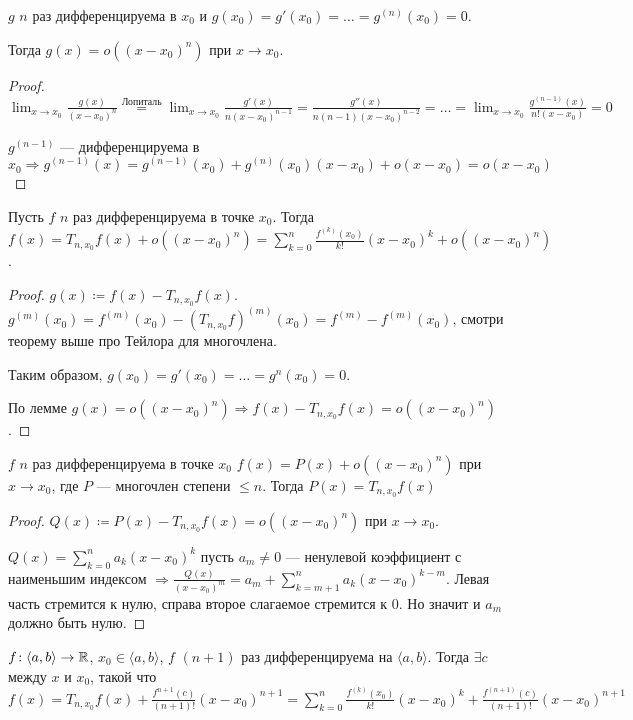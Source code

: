 \begin{lemma}
    $g$  $n$ раз дифференцируема в  $x_0$ и  $g(x_0) = g'(x_0) = \ldots = g^{(n)}(x_0) = 0$.

    Тогда $g(x) = o((x-x_0)^n)$ при $x \to x_0$.
\end{lemma}
\begin{proof}
    $\lim_{x \to x_0} \frac{g(x)}{(x-x_0)^n} \stackrel{\text{Лопиталь}}{=} \lim_{x \to x_0}\frac{g'(x)}{n(x-x_0)^{n-1}} = \frac{g''(x)}{n(n-1)(x-x_0)^{n-2}} = \ldots = \lim_{x \to x_0}\frac{g^{(n-1)}(x)}{n! (x-x_0)} = 0$ 

    $g^{(n-1)}$ --- дифференцируема в  $x_0 \Rightarrow g^{(n-1)}(x)= g^{(n-1)}(x_0)+g^{(n)}(x_0)(x - x_0) + o(x-x_0) = o(x-x_0)$ 
\end{proof}
\begin{theorem}
    Пусть $f$  $n$ раз дифференцируема в точке  $x_0$. Тогда $f(x) = T_{n, x_0}f(x) + o((x-x_0)^n) = \sum_{k=0}^n \frac{f^{(k)}(x_0)}{k!}(x-x_0)^k + o((x-x_0)^n)$.
\end{theorem}
\begin{proof}
    $g(x) \coloneqq f(x) - T_{n,x_0}f(x)$. $g^{(m)}(x_0) = f^{(m)}(x_0) - (T_{n,x_0} f)^{(m)}(x_0) = f^{(m)} - f^{(m)}(x_0)$, смотри теорему выше про Тейлора для многочлена.

    Таким образом, $g(x_0) = g'(x_0) = \ldots = g^{n}(x_0) = 0$.

    По лемме $g(x) = o((x-x_0)^n) \Rightarrow f(x) - T_{n, x_0}f(x) = o((x - x_0)^n)$.
\end{proof}
\begin{consequence}
    $f$  $n$ раз дифференцируема в точке  $x_0$ $f(x) = P(x) + o((x-x_0)^n)$ при $x\to x_0$, где $P$ --- многочлен степени $\le n$. Тогда $P(x) = T_{n,x_0}f(x)$ 
\end{consequence}
\begin{proof}
    $Q(x) \coloneqq P(x) - T_{n, x_0}f(x) = o((x-x_0)^n)$ при $x \to x_0$.

    $Q(x) = \sum_{k=0}^n a_k(x-x_0)^k$ пусть $a_m \neq 0$ --- ненулевой коэффициент с наименьшим индексом  $\Rightarrow \frac{Q(x)}{(x-x_0)^m} = a_m + \sum_{k=m+1}^n a_k(x-x_0)^{k-m}$. Левая часть стремится к нулю, справа второе слагаемое стремится к 0. Но значит и $a_m$ должно быть нулю.
\end{proof}
\begin{theorem}
    $f\!: \langle a, b \rangle \to \mathbb{R}$,  $x_0 \in \langle a, b \rangle$, $f$  $(n+1)$ раз дифференцируема на  $\langle a, b \rangle$. Тогда  $\exists c$ между  $x$ и  $x_0$, такой что  $f(x) = T_{n, x_0}f(x) + \frac{f^{n+1}(c)}{(n+1)!}(x-x_0)^{n+1} = \sum_{k=0}^n \frac{f^{(k)}(x_0)}{k!}(x-x_0)^k + \frac{f^{(n+1)}(c)}{(n+1)!}(x-x_0)^{n+1}$
\end{theorem}
